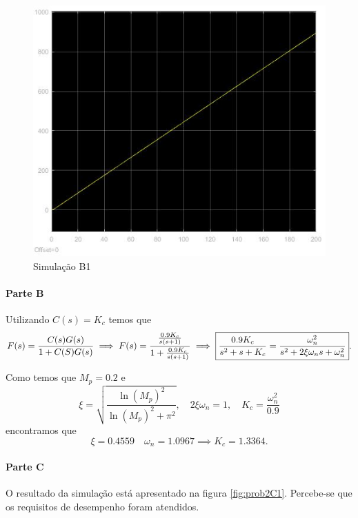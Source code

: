 \documentclass[
]{book}
\theoremstyle{definition}
\theoremstyle{definition}
\theoremstyle{definition}
\theoremstyle{remark}
\begin{document}
\begin{figure}

{\centering \includegraphics[width=0.8\linewidth]{Imagens/Lab5/Resolução/prob2A1} 

}

\caption{Simulação B1}\label{fig:prob2A1}
\end{figure}

\hypertarget{parte-b-6}{%
\paragraph{Parte B}\label{parte-b-6}}

Utilizando \(C(s) = K_c\) temos que
\[
F(s) = \frac{C(s)G(s)}{1+C(S)G(s)} \implies F(s) = \frac{\frac{0.9K_c}{s(s+1)}}{1+\frac{0.9K_c}{s(s+1)}} \\
\implies \boxed{\frac{0.9K_c}{s^2+s+K_c} = \frac{\omega_n^2}{s^2+2\xi\omega_ns+\omega_n^2}}.
\]

Como temos que \(M_p = 0.2\) e
\[
\xi = \sqrt{\frac{\ln{(M_p)}^2}{\ln{(M_p)}^2+\pi^2}}, \quad 2\xi\omega_n=1, \quad K_c=\frac{\omega_n^2}{0.9}
\]
encontramos que
\[
\xi = 0.4559\quad \omega_n = 1.0967 \implies \boxed{K_c = 1.3364}. 
\]

\hypertarget{parte-c-4}{%
\paragraph{Parte C}\label{parte-c-4}}

O resultado da simulação está apresentado na figura \ref{fig:prob2C1}. Percebe-se que os requisitos de desempenho foram atendidos.
\end{document}
